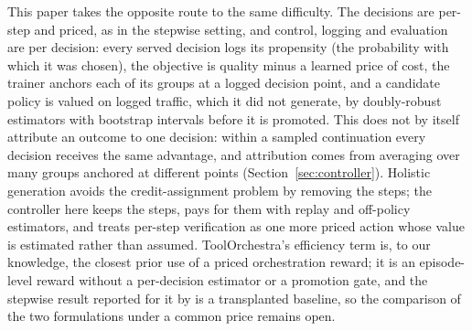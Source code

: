\documentclass[10pt]{article}
\begin{document}
This paper takes the opposite route to the same difficulty. The decisions are per-step and priced, as in the stepwise setting, and control, logging and evaluation are per decision: every served decision logs its propensity (the probability with which it was chosen), the objective is quality minus a learned price of cost, the trainer anchors each of its groups at a logged decision point, and a candidate policy is valued on logged traffic, which it did not generate, by doubly-robust estimators with bootstrap intervals before it is promoted. This does not by itself attribute an outcome to one decision: within a sampled continuation every decision receives the same advantage, and attribution comes from averaging over many groups anchored at different points (Section~\ref{sec:controller}). Holistic generation avoids the credit-assignment problem by removing the steps; the controller here keeps the steps, pays for them with replay and off-policy estimators, and treats per-step verification as one more priced action whose value is estimated rather than assumed. ToolOrchestra's efficiency term is, to our knowledge, the closest prior use of a priced orchestration reward; it is an episode-level reward without a per-decision estimator or a promotion gate, and the stepwise result reported for it by \citet{masorchestra2026} is a transplanted baseline, so the comparison of the two formulations under a common price remains open.
\end{document}
